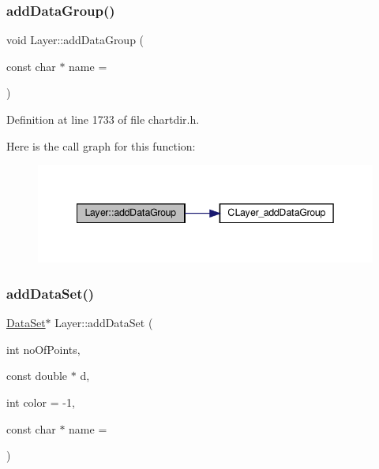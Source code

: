 \subsubsection{\texorpdfstring{add\+Data\+Group()}{addDataGroup()}}
{\footnotesize\ttfamily void Layer\+::add\+Data\+Group (\begin{DoxyParamCaption}\item[{const char $\ast$}]{name = {} }\end{DoxyParamCaption})\hspace{0.3cm}{\ttfamily [inline]}}



Definition at line 1733 of file chartdir.\+h.

Here is the call graph for this function\+:
\nopagebreak
\begin{figure}[H]
\begin{center}
\leavevmode
\includegraphics[width=342pt]{class_layer_af14282bdf56c0987e2bd1510fb83a9b4_cgraph}
\end{center}
\end{figure}
\mbox{\label{class_layer_a6a53587a5c2a6800573fb4c7a782887b}} 
\subsubsection{\texorpdfstring{add\+Data\+Set()}{addDataSet()}\hspace{0.1cm}{\footnotesize\ttfamily [1/2]}}
{\footnotesize\ttfamily \hyperlink{class_data_set}{Data\+Set}$\ast$ Layer\+::add\+Data\+Set (\begin{DoxyParamCaption}\item[{int}]{no\+Of\+Points,  }\item[{const double $\ast$}]{d,  }\item[{int}]{color = {\ttfamily -\/1},  }\item[{const char $\ast$}]{name = {} }\end{DoxyParamCaption})\hspace{0.3cm}{\ttfamily [inline]}}



